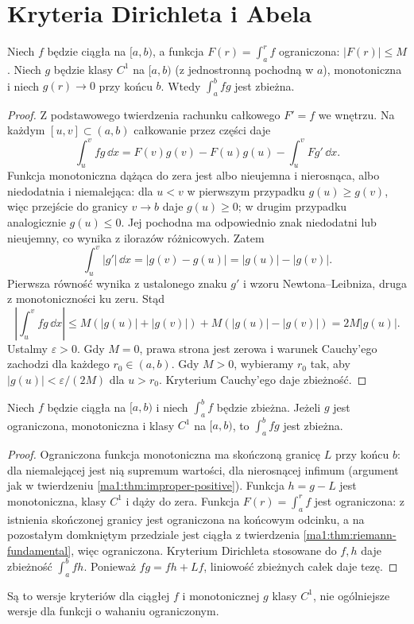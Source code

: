 \section{Kryteria Dirichleta i Abela}
\begin{twierdzenie}
\label{ma1:thm:improper-dirichlet}
Niech $f$ będzie ciągła na $[a,b)$, a funkcja $F(r)=\int_a^r f$ ograniczona: $|F(r)|\le M$. Niech $g$ będzie klasy $C^1$ na $[a,b)$ (z jednostronną pochodną w $a$), monotoniczna i niech $g(r)\to0$ przy końcu $b$. Wtedy $\int_a^b fg$ jest zbieżna.
\end{twierdzenie}
\begin{proof}
Z podstawowego twierdzenia rachunku całkowego $F'=f$ we wnętrzu. Na każdym $[u,v]\subset(a,b)$ całkowanie przez części daje
\[
 \int_u^v fg\,\dd x=F(v)g(v)-F(u)g(u)-\int_u^v Fg'\,\dd x.
\]
Funkcja monotoniczna dążąca do zera jest albo nieujemna i nierosnąca, albo niedodatnia i niemalejąca: dla $u<v$ w pierwszym przypadku $g(u)\ge g(v)$, więc przejście do granicy $v\to b$ daje $g(u)\ge0$; w drugim przypadku analogicznie $g(u)\le0$. Jej pochodna ma odpowiednio znak niedodatni lub nieujemny, co wynika z ilorazów różnicowych. Zatem
\[
 \int_u^v |g'|\,\dd x=|g(v)-g(u)|=|g(u)|-|g(v)|.
\]
Pierwsza równość wynika z ustalonego znaku $g'$ i wzoru Newtona--Leibniza, druga z monotoniczności ku zeru. Stąd
\[
 \left|\int_u^v fg\,\dd x\right|
 \le M(|g(u)|+|g(v)|)+M(|g(u)|-|g(v)|)
 =2M|g(u)|.
\]
Ustalmy $\varepsilon>0$. Gdy $M=0$, prawa strona jest zerowa i warunek Cauchy'ego zachodzi dla każdego $r_0\in(a,b)$. Gdy $M>0$, wybieramy $r_0$ tak, aby $|g(u)|<\varepsilon/(2M)$ dla $u>r_0$. Kryterium Cauchy'ego daje zbieżność.
\end{proof}
\begin{twierdzenie}
\label{ma1:thm:improper-abel}
Niech $f$ będzie ciągła na $[a,b)$ i niech $\int_a^b f$ będzie zbieżna. Jeżeli $g$ jest ograniczona, monotoniczna i klasy $C^1$ na $[a,b)$, to $\int_a^b fg$ jest zbieżna.
\end{twierdzenie}
\begin{proof}
Ograniczona funkcja monotoniczna ma skończoną granicę $L$ przy końcu $b$: dla niemalejącej jest nią supremum wartości, dla nierosnącej infimum (argument jak w twierdzeniu \ref{ma1:thm:improper-positive}). Funkcja $h=g-L$ jest monotoniczna, klasy $C^1$ i dąży do zera. Funkcja $F(r)=\int_a^r f$ jest ograniczona: z istnienia skończonej granicy jest ograniczona na końcowym odcinku, a na pozostałym domkniętym przedziale jest ciągła z twierdzenia \ref{ma1:thm:riemann-fundamental}, więc ograniczona. Kryterium Dirichleta stosowane do $f,h$ daje zbieżność $\int_a^b fh$. Ponieważ $fg=fh+Lf$, liniowość zbieżnych całek daje tezę.
\end{proof}
Są to wersje kryteriów dla ciągłej $f$ i monotonicznej $g$ klasy $C^1$, nie ogólniejsze wersje dla funkcji o wahaniu ograniczonym.


